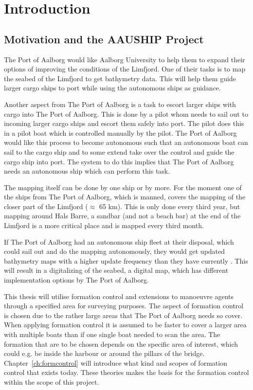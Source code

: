 \chapter{Introduction}

\section{Motivation and the AAUSHIP Project}
The Port of Aalborg would like Aalborg University to help them to expand their options of improving the conditions of the Limfjord. One of their tasks is to map the seabed of the Limfjord to get bathymetry data. This will help them guide larger cargo ships to port while using the autonomous ships as guidance.

Another aspect from The Port of Aalborg is a task to escort larger ships with cargo into The Port of Aalborg. This is done by a pilot whom needs to sail out to incoming larger cargo ships and escort them safely into port. The pilot does this in a pilot boat which is controlled manually by the pilot. The Port of Aalborg would like this process to become autonomous such that an autonomous boat can sail to the cargo ship and to some extend take over the control and guide the cargo ship into port. The system to do this implies that The Port of Aalborg needs an autonomous ship which can perform this task.

The mapping itself can be done by one ship or by more. For the moment one of the ships from The Port of Aalborg, which is manned, covers the mapping of the closer part of the Limfjord ($\approx$ 65 km). This is only done every third year, but mapping around Hals Barre, a sandbar (and not a beach bar) at the end of the Limfjord is a more critical place and is mapped every third month.

If The Port of Aalborg had an autonomous ship fleet at their disposal, which could sail out and do the mapping autonomously, they would get updated bathymetry maps with a higher update frequency than they have currently \citep{portofaalborg}. This will result in a digitalizing of the seabed, a digital map, which has different implementation options by The Port of Aalborg.

This thesis will utilise formation control and extensions to manoeuvre agents through a specified area for surveying purposes. The aspect of formation control is chosen due to the rather large areas that The Port of Aalborg needs so cover. When applying formation control it is assumed to be faster to cover a larger area with multiple boats than if one single boat needed to scan the area. The formation that are to be chosen depends on the specific area of interest, which could e.g. be inside the harbour or around the pillars of the bridge. Chapter~\vref{ch:formcontrol} will introduce what kind and scopes of formation control that exists today. These theories makes the basis for the formation control within the scope of this project.

